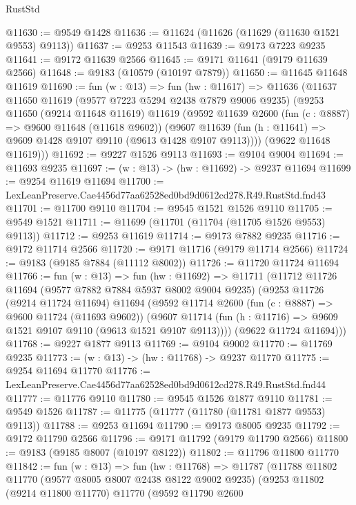 \begin{lexlean}{RustStd}
\begin{coremodule}
@11630 := @9549 @1428
@11636 := @11624 (@11626 (@11629 (@11630 @1521 @9553) @9113))
@11637 := @9253 @11543
@11639 := @9173 @7223 @9235
@11641 := @9172 @11639 @2566
@11645 := @9171 @11641 (@9179 @11639 @2566)
@11648 := @9183 (@10579 (@10197 @7879))
@11650 := @11645 @11648 @11619
@11690 := fun (w : @13) =>
  fun (hw : @11617) =>
  @11636
    (@11637
      @11650
      @11619
      (@9577 @7223 @5294 @2438 @7879 @9006 @9235)
      (@9253
        @11650
        (@9214 @11648 @11619)
        @11619
        (@9592
          @11639
          @2600
          (fun (c : @8887) => @9600 @11648 (@11618 @9602))
          (@9607 @11639 (fun (h : @11641) => @9609 @1428 @9107 @9110 (@9613 @1428 @9107 @9113))))
        (@9622 @11648 @11619)))
@11692 := @9227 @1526 @9113
@11693 := @9104 @9004
@11694 := @11693 @9235
@11697 := (w : @13) -> (hw : @11692) -> @9237 @11694
@11699 := @9254 @11619 @11694
@11700 := LexLeanPreserve.Cae4456d77aa62528ed0bd9d0612cd278.R49.RustStd.fnd43
@11701 := @11700 @9110
@11704 := @9545 @1521 @1526 @9110
@11705 := @9549 @1521
@11711 := @11699 (@11701 (@11704 (@11705 @1526 @9553) @9113))
@11712 := @9253 @11619
@11714 := @9173 @7882 @9235
@11716 := @9172 @11714 @2566
@11720 := @9171 @11716 (@9179 @11714 @2566)
@11724 := @9183 (@9185 @7884 (@11112 @8002))
@11726 := @11720 @11724 @11694
@11766 := fun (w : @13) =>
  fun (hw : @11692) =>
  @11711
    (@11712
      @11726
      @11694
      (@9577 @7882 @7884 @5937 @8002 @9004 @9235)
      (@9253
        @11726
        (@9214 @11724 @11694)
        @11694
        (@9592
          @11714
          @2600
          (fun (c : @8887) => @9600 @11724 (@11693 @9602))
          (@9607 @11714 (fun (h : @11716) => @9609 @1521 @9107 @9110 (@9613 @1521 @9107 @9113))))
        (@9622 @11724 @11694)))
@11768 := @9227 @1877 @9113
@11769 := @9104 @9002
@11770 := @11769 @9235
@11773 := (w : @13) -> (hw : @11768) -> @9237 @11770
@11775 := @9254 @11694 @11770
@11776 := LexLeanPreserve.Cae4456d77aa62528ed0bd9d0612cd278.R49.RustStd.fnd44
@11777 := @11776 @9110
@11780 := @9545 @1526 @1877 @9110
@11781 := @9549 @1526
@11787 := @11775 (@11777 (@11780 (@11781 @1877 @9553) @9113))
@11788 := @9253 @11694
@11790 := @9173 @8005 @9235
@11792 := @9172 @11790 @2566
@11796 := @9171 @11792 (@9179 @11790 @2566)
@11800 := @9183 (@9185 @8007 (@10197 @8122))
@11802 := @11796 @11800 @11770
@11842 := fun (w : @13) =>
  fun (hw : @11768) =>
  @11787
    (@11788
      @11802
      @11770
      (@9577 @8005 @8007 @2438 @8122 @9002 @9235)
      (@9253
        @11802
        (@9214 @11800 @11770)
        @11770
        (@9592
          @11790
          @2600

\end{coremodule}
\end{lexlean}

